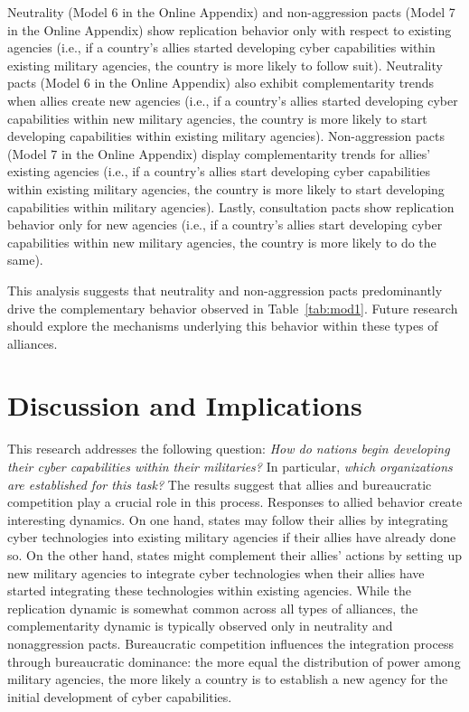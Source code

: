 \documentclass[12pt, letterpaper]{article}
\theoremstyle{plain}
\theoremstyle{remark}
\begin{document}
Neutrality (Model 6 in the Online Appendix) and non-aggression pacts (Model 7 in the Online Appendix) show replication behavior only with respect to existing agencies (i.e., if a country’s allies started developing cyber capabilities within existing military agencies, the country is more likely to follow suit). Neutrality pacts (Model 6 in the Online Appendix) also exhibit complementarity trends when allies create new agencies (i.e., if a country’s allies started developing cyber capabilities within new military agencies, the country is more likely to start developing capabilities within existing military agencies). Non-aggression pacts (Model 7 in the Online Appendix) display complementarity trends for allies' existing agencies (i.e., if a country’s allies start developing cyber capabilities within existing military agencies, the country is more likely to start developing capabilities within military agencies). Lastly, consultation pacts show replication behavior only for new agencies (i.e., if a country’s allies start developing cyber capabilities within new military agencies, the country is more likely to do the same).

This analysis suggests that neutrality and non-aggression pacts predominantly drive the complementary behavior observed in Table~\ref{tab:mod1}. Future research should explore the mechanisms underlying this behavior within these types of alliances.



\section*{Discussion and Implications}\label{sec:discussion}

\noindent
This research addresses the following question: \textit{How do nations begin developing their cyber capabilities within their militaries?} In particular, \textit{which organizations are established for this task?} The results suggest that allies and bureaucratic competition play a crucial role in this process. Responses to allied behavior create interesting dynamics. On one hand, states may follow their allies by integrating cyber technologies into existing military agencies if their allies have already done so. On the other hand, states might complement their allies' actions by setting up new military agencies to integrate cyber technologies when their allies have started integrating these technologies within existing agencies. While the replication dynamic is somewhat common across all types of alliances, the complementarity dynamic is typically observed only in neutrality and nonaggression pacts. Bureaucratic competition influences the integration process through bureaucratic dominance: the more equal the distribution of power among military agencies, the more likely a country is to establish a new agency for the initial development of cyber capabilities. 
\end{document}
